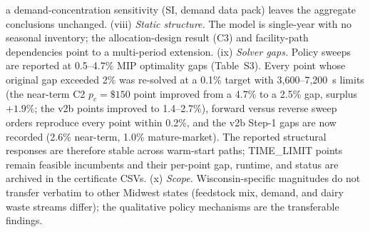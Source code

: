 a demand-concentration sensitivity (SI, demand data pack) leaves the aggregate
conclusions unchanged. (viii) \emph{Static
structure.} The model is single-year with no seasonal inventory; the
allocation-design result (C3) and facility-path dependencies point to a
multi-period extension. (ix) \emph{Solver gaps.} Policy sweeps are reported at
0.5--4.7\% MIP optimality gaps (Table~S3). Every point whose original gap
exceeded 2\% was re-solved at a 0.1\% target with 3{,}600--7{,}200~s limits
(the near-term C2 $p_c=\$150$ point improved from a 4.7\% to a 2.5\% gap,
surplus $+1.9\%$; the v2b points improved to 1.4--2.7\%), forward versus
reverse sweep orders reproduce every point within 0.2\%, and the v2b Step-1
gaps are now recorded (2.6\% near-term, 1.0\% mature-market). The reported
structural responses are therefore stable across warm-start paths; TIME\_LIMIT
points remain feasible incumbents and their per-point gap, runtime, and status
are archived in the certificate CSVs. (x) \emph{Scope.} Wisconsin-specific magnitudes do not transfer
verbatim to other Midwest states (feedstock mix, demand, and dairy waste
streams differ); the qualitative policy mechanisms are the transferable
findings.
